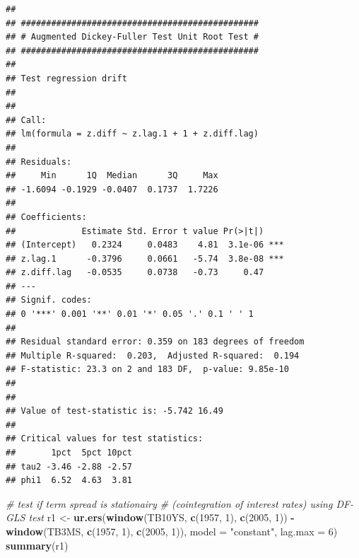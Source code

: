 \documentclass[]{book}
\newenvironment{Shaded}{\begin{snugshade}}{\end{snugshade}}
\newcommand{\CommentTok}[1]{\textcolor[rgb]{0.56,0.35,0.01}{\textit{#1}}}
\newcommand{\DataTypeTok}[1]{\textcolor[rgb]{0.13,0.29,0.53}{#1}}
\newcommand{\DecValTok}[1]{\textcolor[rgb]{0.00,0.00,0.81}{#1}}
\newcommand{\KeywordTok}[1]{\textcolor[rgb]{0.13,0.29,0.53}{\textbf{#1}}}
\newcommand{\NormalTok}[1]{#1}
\newcommand{\OperatorTok}[1]{\textcolor[rgb]{0.81,0.36,0.00}{\textbf{#1}}}
\newcommand{\StringTok}[1]{\textcolor[rgb]{0.31,0.60,0.02}{#1}}
\begin{document}
\begin{verbatim}
## 
## ############################################### 
## # Augmented Dickey-Fuller Test Unit Root Test # 
## ############################################### 
## 
## Test regression drift 
## 
## 
## Call:
## lm(formula = z.diff ~ z.lag.1 + 1 + z.diff.lag)
## 
## Residuals:
##     Min      1Q  Median      3Q     Max 
## -1.6094 -0.1929 -0.0407  0.1737  1.7226 
## 
## Coefficients:
##             Estimate Std. Error t value Pr(>|t|)    
## (Intercept)   0.2324     0.0483    4.81  3.1e-06 ***
## z.lag.1      -0.3796     0.0661   -5.74  3.8e-08 ***
## z.diff.lag   -0.0535     0.0738   -0.73     0.47    
## ---
## Signif. codes:  
## 0 '***' 0.001 '**' 0.01 '*' 0.05 '.' 0.1 ' ' 1
## 
## Residual standard error: 0.359 on 183 degrees of freedom
## Multiple R-squared:  0.203,  Adjusted R-squared:  0.194 
## F-statistic: 23.3 on 2 and 183 DF,  p-value: 9.85e-10
## 
## 
## Value of test-statistic is: -5.742 16.49 
## 
## Critical values for test statistics: 
##       1pct  5pct 10pct
## tau2 -3.46 -2.88 -2.57
## phi1  6.52  4.63  3.81
\end{verbatim}

\begin{Shaded}
\begin{Highlighting}[]
\CommentTok{# test if term spread is stationairy }
\CommentTok{# (cointegration of interest rates) using DF-GLS test}
\NormalTok{r1 <-}\StringTok{ }\KeywordTok{ur.ers}\NormalTok{(}\KeywordTok{window}\NormalTok{(TB10YS, }\KeywordTok{c}\NormalTok{(}\DecValTok{1957}\NormalTok{, }\DecValTok{1}\NormalTok{), }\KeywordTok{c}\NormalTok{(}\DecValTok{2005}\NormalTok{, }\DecValTok{1}\NormalTok{)) }\OperatorTok{-}\StringTok{ }\KeywordTok{window}\NormalTok{(TB3MS, }\KeywordTok{c}\NormalTok{(}\DecValTok{1957}\NormalTok{, }\DecValTok{1}\NormalTok{), }\KeywordTok{c}\NormalTok{(}\DecValTok{2005}\NormalTok{, }\DecValTok{1}\NormalTok{)),}
             \DataTypeTok{model =} \StringTok{"constant"}\NormalTok{, }
             \DataTypeTok{lag.max =} \DecValTok{6}\NormalTok{)}
\KeywordTok{summary}\NormalTok{(r1)}
\end{Highlighting}
\end{Shaded}
\end{document}

